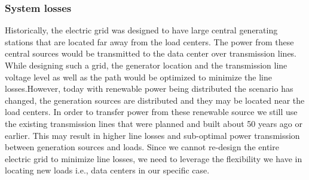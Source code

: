 \subsubsection{System losses}
Historically, the electric grid was designed to have large central generating stations that are located far away from the load centers. The power from these central sources would be transmitted to the data center over transmission lines. While designing such a grid, the generator location and the transmission line voltage level as well as the path would be optimized to minimize the line losses.However, today with renewable power being distributed the scenario has changed, the generation sources are distributed and they may be located near the load centers. In order to transfer power from these renewable source we still use the existing transmission lines that were planned and built about 50 years ago or earlier. This may result in higher line losses and sub-optimal power transmission between generation sources and loads.  Since we cannot re-design the entire electric grid to minimize line losses, we need to leverage the flexibility we have in locating new loads i.e., data centers in our specific case.

